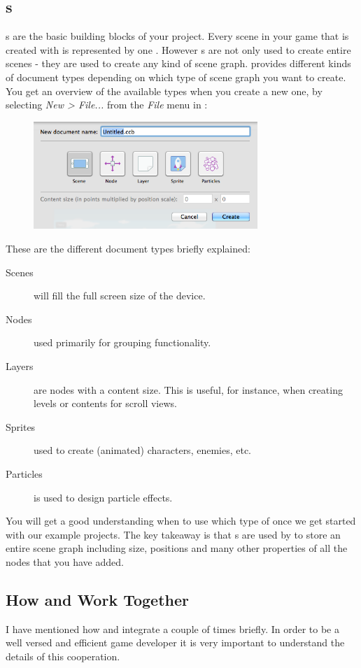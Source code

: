 \newpage{}
\subsection{\ccbfile{}s}
\ccbfile{}s are the basic building blocks of your \SB{} project. Every scene in
your game that is created with \SB{} is represented by one \ccbfile{}. However
\ccbfile{}s are not only used to create entire scenes - they are used to create
any kind of scene graph. \SB{} provides different kinds of document types
depending on which type of scene graph you want to create. You get an overview of the
available \ccbfile{} types when you create a new one, by selecting
\textit{New > File... } from the \textit{File} menu in \SB{}:
\label{DocumentTypes}
\begin{figure}[H]
		\centering
		\includegraphics[width=240pt]{images/spritebuilder/new-ccb.png}     
\end{figure} 
These are the different document types briefly explained:
\begin{description}
\item[Scenes] will fill the full screen size of the device.
\item[Nodes] used primarily for grouping functionality.
\item[Layers] are nodes with a content size. This is useful, for instance, when
creating levels or contents for scroll views.
\item[Sprites] used to create (animated) characters, enemies, etc.
\item[Particles] is used to design particle effects.
\end{description}
You will get a good understanding when to use which type of \ccbfile{} once we
get started with our example projects. The key takeaway is that \ccbfile{}s are
used by \SB{} to store an entire scene graph including size, positions and many
other properties of all the nodes that you have added.

\subsection{How \SB{} and \xcode{} Work Together}
\label{Publish}
I have mentioned how \SB{} and \xcode{} integrate a couple of times briefly. In
order to be a well versed and efficient \SB{} game developer it is very
important to understand the details of this cooperation.

